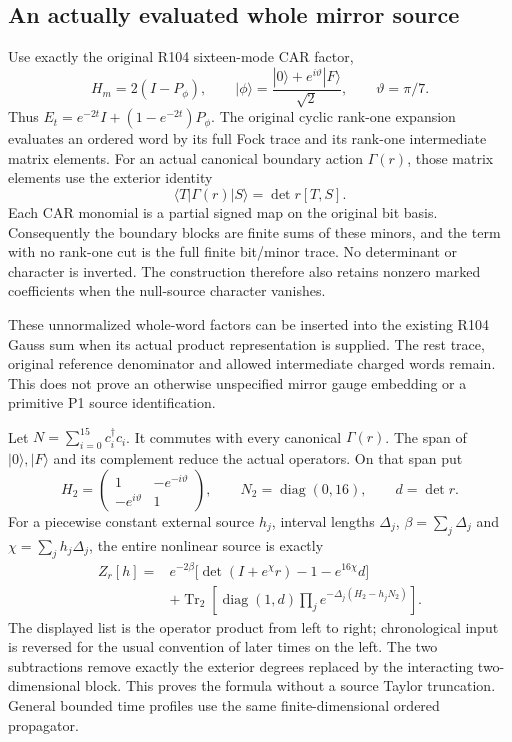 \subsection*{An actually evaluated whole mirror source}
Use exactly the original R104 sixteen-mode CAR factor,
\[
 H_m=2(I-P_\phi),\qquad
 |\phi\rangle=\frac{|0\rangle+e^{i\vartheta}|F\rangle}{\sqrt2},
 \qquad \vartheta=\pi/7.
\]
Thus \(E_t=e^{-2t}I+(1-e^{-2t})P_\phi\). The original cyclic rank-one
expansion evaluates an ordered word by its full Fock trace and its
rank-one intermediate matrix elements. For an actual canonical boundary
action \(\Gamma(r)\), those matrix elements use the exterior identity
\[
 \langle T|\Gamma(r)|S\rangle=\det r[T,S].
\]
Each CAR monomial is a partial signed map on the original bit basis.
Consequently the boundary blocks are finite sums of these minors, and
the term with no rank-one cut is the full finite bit/minor trace.
No determinant or character is inverted. The construction therefore
also retains nonzero marked coefficients when the null-source
character vanishes.

These unnormalized whole-word factors can be inserted into the existing
R104 Gauss sum when its actual product representation is supplied.
The rest trace, original reference denominator and allowed intermediate
charged words remain. This does not prove an otherwise unspecified
mirror gauge embedding or a primitive P1 source identification.

Let \(N=\sum_{i=0}^{15}c_i^\dagger c_i\). It commutes with every
canonical \(\Gamma(r)\). The span of \(|0\rangle,|F\rangle\) and its
complement reduce the actual operators. On that span put
\[
 H_2=\begin{pmatrix}1&-e^{-i\vartheta}\\-e^{i\vartheta}&1\end{pmatrix},
 \qquad N_2=\operatorname{diag}(0,16),\qquad d=\det r.
\]
For a piecewise constant external source \(h_j\), interval lengths
\(\Delta_j\), \(\beta=\sum_j\Delta_j\) and
\(\chi=\sum_j h_j\Delta_j\), the entire nonlinear source is exactly
\[
\begin{aligned}
 Z_r[h]={}&e^{-2\beta}
   \bigl[\det(I+e^\chi r)-1-e^{16\chi}d\bigr]\\
 &+\operatorname{Tr}_2\!\left[
 \operatorname{diag}(1,d)\prod_j e^{-\Delta_j(H_2-h_jN_2)}\right].
\end{aligned}
\]
The displayed list is the operator product from left to right;
chronological input is reversed for the usual convention of later
times on the left. The two subtractions remove exactly the exterior
degrees replaced by the interacting two-dimensional block. This proves
the formula without a source Taylor truncation. General bounded time
profiles use the same finite-dimensional ordered propagator.

